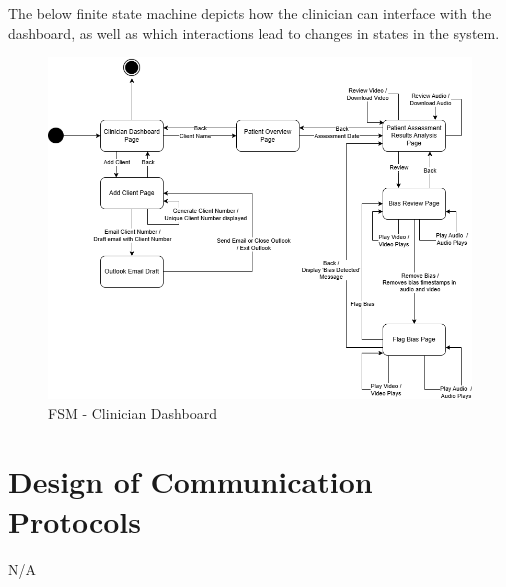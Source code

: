 \documentclass[12pt, titlepage]{article}
\begin{document}
\newpage

\hspace{1.5em}The below finite state machine depicts how the clinician can interface with the dashboard, as well as which interactions lead to changes in states in the system.
\begin{figure}[H]
  \centering
  \includegraphics[scale=0.6]{images/FSM_Clinician_Dashboard.png}
  \caption{FSM - Clinician Dashboard}
\end{figure}

\newpage

\section{Design of Communication Protocols}

N/A
\end{document}
